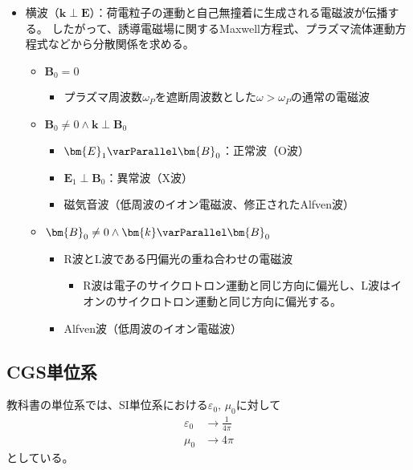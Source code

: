 \begin{itemize}
\begin{itemize}
\begin{itemize}
\begin{itemize}
			                  \end{itemize}
		            \end{itemize}
	      \end{itemize}
	\item 横波（$\bm{k}\perp \bm{E}$）：{\color{red}荷電粒子の運動と自己無撞着に生成される電磁波}が伝播する。
	      したがって、{\color{red}誘導電磁場に関するMaxwell方程式}、{\color{red}プラズマ流体運動方程式}などから分散関係を求める。
	      \begin{itemize}
		      \item $\bm{B}_0 = 0$
		            \begin{itemize}
			            \item プラズマ周波数$\omega_P$を遮断周波数とした$\omega > \omega_P$の通常の電磁波
		            \end{itemize}
		      \item $\bm{B}_0 \neq 0 \wedge \bm{k}\perp \bm{B}_0$
		            \begin{itemize}
			            \item $\bm{E}_1 \varParallel \bm{B}_0$：正常波（O波）
			            \item $\bm{E}_1 \perp \bm{B}_0$：異常波（X波）
			            \item 磁気音波（低周波のイオン電磁波、修正されたAlfven波）
		            \end{itemize}
		      \item $\bm{B}_0 \neq 0 \wedge \bm{k}\varParallel \bm{B}_0$
		            \begin{itemize}
			            \item R波とL波である円偏光の重ね合わせの電磁波
			                  \begin{itemize}
				                  \item R波は電子のサイクロトロン運動と同じ方向に偏光し、L波はイオンのサイクロトロン運動と同じ方向に偏光する。
			                  \end{itemize}
			            \item Alfven波（低周波のイオン電磁波）
		            \end{itemize}
	      \end{itemize}
\end{itemize}


\subsection{CGS単位系}
教科書の単位系では、SI単位系における$\varepsilon_0,\,\mu_0$に対して
\begin{align}
	\varepsilon_0 & \to \frac{1}{4\pi} \\
	\mu_0         & \to 4\pi
\end{align}
としている。

